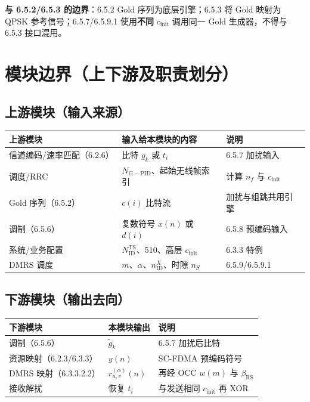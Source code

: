 \documentclass[11pt,a4paper]{ctexart}
\newcommand{\NGPID}{N_{\mathrm{G-PID}}}
\begin{document}
\textbf{与 6.5.2/6.5.3 的边界}：6.5.2 Gold 序列为底层引擎；6.5.3 将 Gold 映射为 QPSK 参考信号；6.5.7/6.5.9.1 使用\textbf{不同} $c_{\mathrm{init}}$ 调用同一 Gold 生成器，不得与 6.5.3 接口混用。

\section{模块边界（上下游及职责划分）}

\subsection{上游模块（输入来源）}

\begin{table}[h]
\centering
\small
\begin{tabular}{p{4.2cm}p{4.5cm}p{5.5cm}}
\toprule
\textbf{上游模块} & \textbf{输入给本模块的内容} & \textbf{说明} \\
\midrule
信道编码/速率匹配（6.2.6） & 比特 $g_k$ 或 $t_i$ & 6.5.7 加扰输入 \\
调度/RRC & $\NGPID$、起始无线帧索引 & 计算 $n_f$ 与 $c_{\mathrm{init}}$ \\
Gold 序列（6.5.2） & $c(i)$ 比特流 & 加扰与组跳共用引擎 \\
调制（6.5.6） & 复数符号 $x(n)$ 或 $d(i)$ & 6.5.8 预编码输入 \\
系统/业务配置 & $N_{\mathrm{ID}}^{\mathrm{TS}}$、510、高层 $c_{\mathrm{init}}$ & 6.3.3 特例 \\
DMRS 调度 & $m$、$\alpha$、$n_{\mathrm{ID}}^{X}$、时隙 $n_S$ & 6.5.9/6.5.9.1 \\
\bottomrule
\end{tabular}
\end{table}

\subsection{下游模块（输出去向）}

\begin{table}[h]
\centering
\small
\begin{tabular}{p{4.2cm}p{4.5cm}p{5.5cm}}
\toprule
\textbf{下游模块} & \textbf{本模块输出} & \textbf{说明} \\
\midrule
调制（6.5.6） & $\tilde{g}_k$ & 6.5.7 加扰后比特 \\
资源映射（6.2.3/6.3.3） & $y(n)$ & SC-FDMA 预编码符号 \\
DMRS 映射（6.3.3.2.2） & $r_{u,v}^{(\alpha)}(n)$ & 再经 OCC $w(m)$ 与 $\beta_{\mathrm{RS}}$ \\
接收解扰 & 恢复 $t_i$ & 与发送相同 $c_{\mathrm{init}}$ 再 XOR \\
\bottomrule
\end{tabular}
\end{table}
\end{document}
